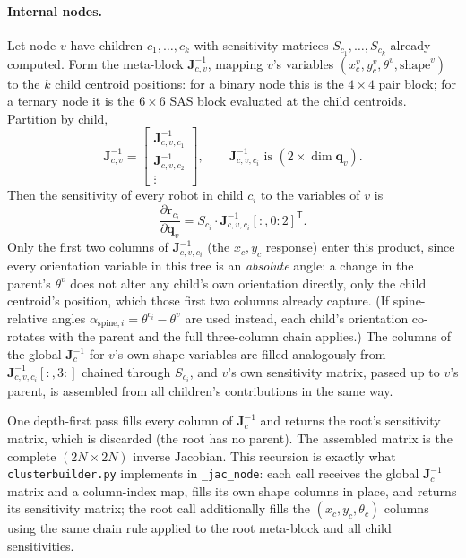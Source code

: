 \documentclass[12pt, letterpaper, oneside]{report}
\begin{document}
\paragraph{Internal nodes.} Let node $v$ have children $c_1,\ldots,c_k$ with
sensitivity matrices $S_{c_1},\ldots,S_{c_k}$ already computed. Form the
meta-block $\mathbf{J}_{c,v}^{-1}$, mapping $v$'s variables
$(x_c^v,y_c^v,\theta^v,\text{shape}^v)$ to the $k$ child centroid positions:
for a binary node this is the $4\times4$ pair block; for a ternary node it
is the $6\times6$ SAS block evaluated at the child centroids. Partition by
child,
\begin{equation}
\mathbf{J}_{c,v}^{-1} = \begin{bmatrix} \mathbf{J}_{c,v,c_1}^{-1} \\ \mathbf{J}_{c,v,c_2}^{-1} \\ \vdots \end{bmatrix},
\qquad \mathbf{J}_{c,v,c_i}^{-1} \text{ is } (2\times\dim\mathbf{q}_v).
\end{equation}
Then the sensitivity of every robot in child $c_i$ to the variables of $v$
is
\begin{equation}
\frac{\partial \mathbf{r}_{c_i}}{\partial \mathbf{q}_v} = S_{c_i} \cdot \mathbf{J}_{c,v,c_i}^{-1}[:,0{:}2]^{\mathsf T}.
\end{equation}
Only the first two columns of $\mathbf{J}_{c,v,c_i}^{-1}$ (the $x_c,y_c$
response) enter this product, since every orientation variable in this
tree is an \emph{absolute} angle: a change in the parent's $\theta^v$ does
not alter any child's own orientation directly, only the child centroid's
position, which those first two columns already capture. (If spine-relative
angles $\alpha_{\text{spine},i}=\theta^{c_i}-\theta^v$ are used instead,
each child's orientation co-rotates with the parent and the full
three-column chain applies.) The columns of the global $\mathbf{J}_c^{-1}$
for $v$'s own shape variables are filled analogously from
$\mathbf{J}_{c,v,c_i}^{-1}[:,3{:}]$ chained through $S_{c_i}$, and $v$'s own
sensitivity matrix, passed up to $v$'s parent, is assembled from all
children's contributions in the same way.

One depth-first pass fills every column of $\mathbf{J}_c^{-1}$ and returns
the root's sensitivity matrix, which is discarded (the root has no parent).
The assembled matrix is the complete $(2N\times2N)$ inverse Jacobian. This
recursion is exactly what \texttt{clusterbuilder.py} implements in
\texttt{\_jac\_node}: each call receives the global $\mathbf{J}_c^{-1}$
matrix and a column-index map, fills its own shape columns in place, and
returns its sensitivity matrix; the root call additionally fills the
$(x_c,y_c,\theta_c)$ columns using the same chain rule applied to the root
meta-block and all child sensitivities.
\end{document}
